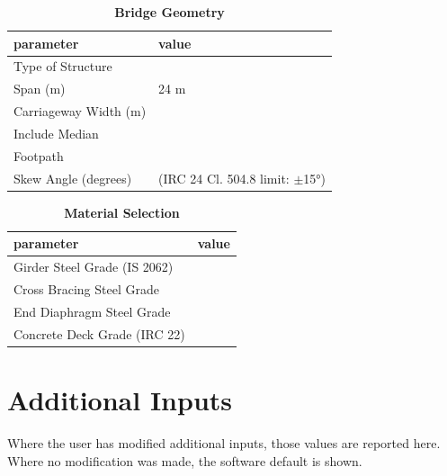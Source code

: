 \documentclass[12pt,a4paper]{report}
\numberwithin{table}{chapter}
\numberwithin{figure}{chapter}
\newcommand{\reportchaptergap}{0.4cm}
\newcommand{\reportbigchaptergap}{0.8cm}
\begin{document}
\begin{table}[H]
\caption{\textbf{Bridge Geometry}}
\label{subsec:bridge-geometry}
\begin{tabular}{|L{5.5cm}|L{8.5cm}|}
\hline
\textbf{parameter} & \textbf{value} \\
\hline
\textnormal{Type of Structure} &  \\
\hline
\textnormal{Span (m)} & 24 m \\
\hline
\textnormal{Carriageway Width (m)} &  \\
\hline
\textnormal{Include Median} &  \\
\hline
\textnormal{Footpath} &  \\
\hline
\textnormal{Skew Angle (degrees)} &  (IRC 24 Cl. 504.8 limit: $\pm$15°) \\
\hline
\end{tabular}
\end{table}
\vspace{\reportchaptergap}

\begin{table}[H]
\caption{\textbf{Material Selection}}
\label{subsec:material}
\begin{tabular}{|L{5.5cm}|L{8.5cm}|}
\hline
\textbf{parameter} & \textbf{value} \\
\hline
\textnormal{Girder Steel Grade (IS 2062)} &  \\
\hline
\textnormal{Cross Bracing Steel Grade} &  \\
\hline
\textnormal{End Diaphragm Steel Grade} &  \\
\hline
\textnormal{Concrete Deck Grade (IRC 22)} &  \\
\hline
\end{tabular}
\end{table}
\vspace{\reportchaptergap}

\newpage
\section{Additional Inputs}
\label{sec:additional-inputs}

Where the user has modified additional inputs, those values are reported here. Where no modification was made, the software default is shown.

\vspace{\reportbigchaptergap}
\end{document}

